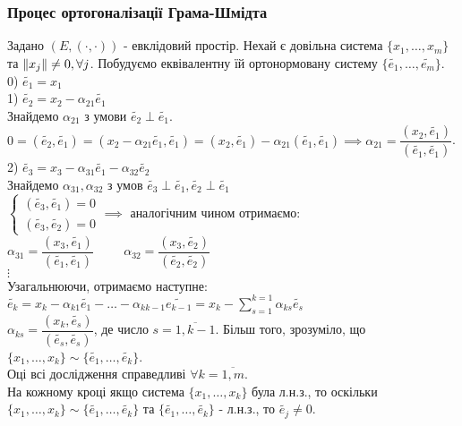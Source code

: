 \documentclass[a4paper, 10pt]{article}
\theoremstyle{theoremdd}
\begin{document}
\subsubsection*{Процес ортогоналізації Грама-Шмідта}
Задано $(E,(\cdot,\cdot))$ - евклідовий простір. Нехай є довільна система $\{x_1,\dots,x_m\}$ та $\norm{x_j} \neq 0, \forall j$. Побудуємо еквівалентну їй ортонормовану систему $\{\tilde{e_1},\dots, \tilde{e_m} \}$.\\
0) $\tilde{e_1}=x_1$\\
1) $\tilde{e_2} = x_2 - \alpha_{21} \tilde{e_1}$\\
Знайдемо $\alpha_{21}$ з умови $\tilde{e_2} \perp \tilde{e_1}$.\\
$0 = (\tilde{e_2}, \tilde{e_1}) = (x_2-\alpha_{21}\tilde{e_1}, \tilde{e_1}) = (x_2, \tilde{e_1})-\alpha_{21} (\tilde{e_1},\tilde{e_1}) \implies \alpha_{21} = \dfrac{(x_2,\tilde{e_1})}{(\tilde{e_1},\tilde{e_1})}$.\\
2) $\tilde{e_3} = x_3 - \alpha_{31} \tilde{e_1} - \alpha_{32} \tilde{e_2}$\\
Знайдемо $\alpha_{31}, \alpha_{32}$ з умов $\tilde{e_3} \perp \tilde{e_1}, \tilde{e_2} \perp \tilde{e_1}$\\
$\begin{cases}
(\tilde{e_3}, \tilde{e_1}) = 0 \\
(\tilde{e_3}, \tilde{e_2}) = 0
\end{cases}
\implies$
аналогічним чином отримаємо:\\
$\alpha_{31} = \dfrac{(x_3, \tilde{e_1})}{(\tilde{e_1},\tilde{e_1})} \hspace{1cm} \alpha_{32} = \dfrac{(x_3, \tilde{e_2})}{(\tilde{e_2},\tilde{e_2})}$\\
$\vdots$\\
Узагальнюючи, отримаємо наступне:\\
$\tilde{e_k} = x_k - \alpha_{k1} \tilde{e_1} - \dots - \alpha_{k k-1} \tilde{e_{k-1}} = x_k - \displaystyle\sum_{s=1}^{k=1} \alpha_{ks} \tilde{e_s}$\\
$\alpha_{ks} = \dfrac{(x_k, \tilde{e_s})}{(\tilde{e_s},\tilde{e_s})}$, де число $s = \overline{1,k-1}$. Більш того, зрозуміло, що $\{x_1,\dots,x_k\} \sim \{\tilde{e_1},\dots, \tilde{e_k}\}$.\\
Оці всі дослідження справедливі $\forall k = \overline{1,m}$.
\bigskip \\
На кожному кроці якщо система $\{x_1,\dots,x_k\}$ була л.н.з., то оскільки $\{x_1,\dots,x_k\} \sim \{\tilde{e_1},\dots,\tilde{e_k}\}$ та $\{\tilde{e_1},\dots,\tilde{e_k}\}$ - л.н.з., то $\tilde{e_j} \neq 0$.
\end{document}

